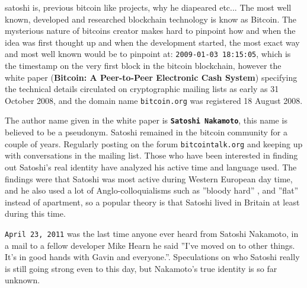 satoshi is, previous bitcoin like projects, why he diapeared etc...
The most well known, developed and researched blockchain technology is know as
Bitcoin. The mysterious nature of bitcoins creator makes hard to pinpoint how
and when the idea was first thought up and when the development started, the
most exact way and most well known would be to pinpoint at:
\texttt{2009-01-03 18:15:05}\cite{genesis}, which is the timestamp on the very
first block in the bitcoin blockchain, however the white paper (\textbf{Bitcoin:
A Peer-to-Peer Electronic Cash System})\cite{nakamoto_bitcoin} specifying the
technical details circulated on cryptographic mailing lists as early as 31
October 2008, and the domain name \texttt{bitcoin.org} was registered 18 August
2008.\cite{bernard_2018}


The author name given in the white paper is \textbf{\texttt{Satoshi Nakamoto}},
this name is believed to be a pseudonym. Satoshi remained in the bitcoin
community for a couple of years. Regularly posting on the forum
\texttt{bitcointalk.org} and keeping up with conversations in the mailing list.
Those who have been interested in finding out Satoshi's real identity have
analyzed his active time and language used. The findings were that Satoshi was
most active during Western European day time, and he also used a lot of
Anglo-colloquialisms such as ''bloody hard'' \cite{nakamoto_bloody}, and
''flat'' instead of apartment, so a popular theory is that Satoshi lived in
Britain at least during this time.\cite{bernard_2018}

\texttt{April 23, 2011} was the last time anyone ever heard from Satoshi
Nakamoto, in a mail to a fellow developer Mike Hearn he said ''I've moved on to
other things.  It's in good hands with Gavin and everyone.''.\cite{nakamoto_last_mail}
Speculations on who Satoshi really is still going strong even to this day, but
Nakamoto's true identity is so far unknown.\cite{bernard_2018}\cite{jeffries_2013}
